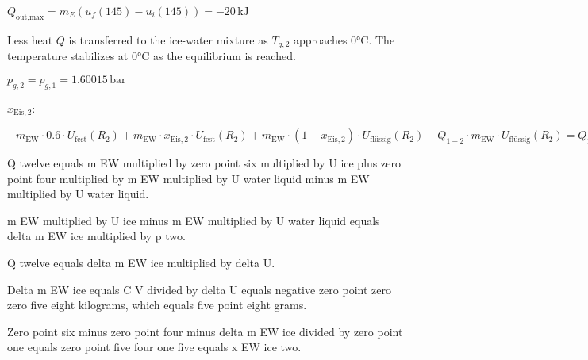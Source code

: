 \( Q_{\text{out,max}} = m_E (u_f(145) - u_i(145)) = -20 \, \text{kJ} \)  

Less heat \( Q \) is transferred to the ice-water mixture as \( T_{g,2} \) approaches 0°C. The temperature stabilizes at 0°C as the equilibrium is reached.  

\( p_{g,2} = p_{g,1} = 1.60015 \, \text{bar} \)

\( x_{\text{Eis},2} \):  

\( - m_{\text{EW}} \cdot 0.6 \cdot U_{\text{fest}}(R_2) + m_{\text{EW}} \cdot x_{\text{Eis},2} \cdot U_{\text{fest}}(R_2) + m_{\text{EW}} \cdot (1 - x_{\text{Eis},2}) \cdot U_{\text{flüssig}}(R_2) - Q_{1-2} \cdot m_{\text{EW}} \cdot U_{\text{flüssig}}(R_2) = Q_{1-2} - 0 \)

Q twelve equals m EW multiplied by zero point six multiplied by U ice plus zero point four multiplied by m EW multiplied by U water liquid minus m EW multiplied by U water liquid.  

m EW multiplied by U ice minus m EW multiplied by U water liquid equals delta m EW ice multiplied by p two.  

Q twelve equals delta m EW ice multiplied by delta U.  

Delta m EW ice equals C V divided by delta U equals negative zero point zero zero five eight kilograms, which equals five point eight grams.  

Zero point six minus zero point four minus delta m EW ice divided by zero point one equals zero point five four one five equals x EW ice two.